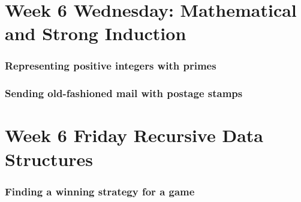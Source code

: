 \newpage

\section*{Week 6 Wednesday: Mathematical and Strong Induction}
%


\newpage


\newpage
\subsubsection*{Representing positive integers with primes}

\newpage
\subsubsection*{Sending old-fashioned mail with postage stamps}

\newpage

\section*{Week 6 Friday Recursive Data Structures}

\subsubsection*{Finding a winning strategy for a game}

\newpage



\vspace{50pt}

\vspace{50pt}

\vspace{50pt}
\newpage

\newpage


